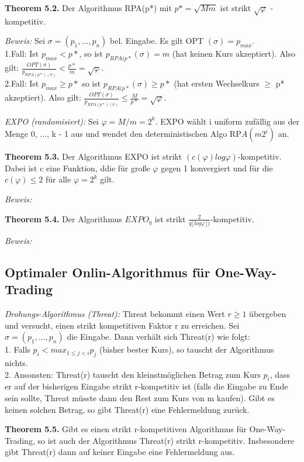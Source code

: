 \textbf{Theorem 5.2.} Der Algorithmus RPA(p*) mit $p* = \sqrt{Mm}$ ist strikt $\sqrt{\varphi}$ - kompetitiv.

\textit{Beweis:} Sei $\sigma = (p_{1}, ..., p_{n})$ bel. Eingabe. Es gilt OPT $(\sigma) = p_{max}$. \\
1.Fall: Ist $p_{max} < p*$, so ist $p_{RPA(p*}(\sigma) = m$ (hat keinen Kurs akzeptiert). Also gilt: $\tfrac{OPT(\sigma)}{p_{RPA(p*)(\sigma)}} < \tfrac{p*}{m} = \sqrt{\varphi}$.\\
2.Fall: Ist $p_{max} \ge p*$ so ist $p_{RPA(p*}(\sigma) \ge p*$ (hat ersten Wechselkurs $\ge$ p* akzeptiert). Also gilt: $\tfrac{OPT(\sigma)}{p_{RPA(p*)(\sigma)}} \le \tfrac{M}{p*} = \sqrt{\varphi}$.

\textit{EXPO (randomisiert):} Sei $\varphi = M / m = 2^k$. EXPO wählt i uniform zufällig aus der Menge {0, ..., k - 1} aus und wendet den deterministischen Algo RP$A(m2^{i})$ an.

\textbf{Theorem 5.3.} Der Algorithmus EXPO ist strikt $(c(\varphi)log\varphi)$-kompetitiv. Dabei ist c eine Funktion, ddie für große $\varphi$ gegen 1 konvergiert und für die $c(\varphi) \le 2$ für alle $\varphi = 2^k$ gilt.

\textit{Beweis:} 

\textbf{Theorem 5.4.} Der Algorithmus $EXPO_{q}$ ist strikt $\tfrac{2}{q\lfloor log\varphi \rfloor)}$-kompetitiv.

\textit{Beweis:} 

\subsection{Optimaler Onlin-Algorithmus für One-Way-Trading}

\textit{Drohungs-Algorithmus (Threat):} Threat bekommt einen Wert $r \ge 1$ übergeben und versucht, einen strikt kompetitiven Faktor r zu erreichen. Sei $\sigma = (p_{1}, ..., p_{n})$ die Eingabe. Dann verhält sich Threat(r) wie folgt:\\
1. Falls $p_{i} < max_{1 \le j < i}p_{j}$ (bisher bester Kurs), so tauscht der Algorithmus nichts.\\
2. Ansonsten: Threat(r) tauscht den kleinstmöglichen Betrag zum Kurs $p_{i}$, dass er auf der bisherigen Eingabe strikt r-kompetitiv ist (falls die Eingabe zu Ende sein sollte, Threat müsste dann den Rest zum Kurs von m kaufen). Gibt es keinen solchen Betrag, so gibt Threat(r) eine Fehlermeldung zurück.

\textbf{Theorem 5.5.} Gibt es einen strikt r-kompetitiven Algorithmus für One-Way-Trading, so ist auch der Algorithmus Threat(r) strikt r-kompetitiv. Insbesondere gibt Threat(r) dann auf keiner Eingabe eine Fehlermeldung aus.

